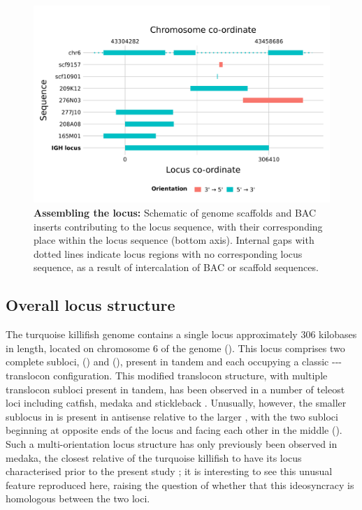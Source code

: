 \begin{figure}
\centering
\includegraphics[width=\textwidth]{_Figures/png/nfu-locus-aln}
\caption[Assembling the \Nfu \igh{} locus]{\textbf{Assembling the \Nfu \igh{} locus:} Schematic of genome scaffolds and BAC inserts contributing to the \Nfu \igh{} locus sequence, with their corresponding place within the locus sequence (bottom axis). Internal gaps with dotted lines indicate locus regions with no corresponding locus sequence, as a result of intercalation of BAC or scaffold sequences.}
\label{fig:nfu-locus-aln}
\end{figure}

\subsection{Overall locus structure}
\label{sec:nfu-locus-structure}
	
The turquoise killifish genome contains a single \igh{} locus approximately 306 kilobases in length, located on chromosome 6 of the \Nfu genome (). This locus comprises two complete subloci,  () and  (), present in tandem and each occupying a classic {\vh-\dh-\jh-\ch} translocon configuration. This modified translocon structure, with multiple translocon subloci present in tandem, has been observed in a number of teleost \igh{} loci including catfish, medaka and stickleback \parencite{fillatreau2013astonishing}. Unusually, however, the smaller  sublocus in \nfu \igh{} is present in antisense relative to the larger , with the two subloci beginning at opposite ends of the locus and facing each other in the middle (). Such a multi-orientation locus structure has only previously been observed in medaka, the closest relative of the turquoise killifish to have its locus characterised prior to the present study \parencite{magadan2011medaka}; it is interesting to see this unusual feature reproduced here, raising the question of whether that this ideosyncracy is homologous between the two loci.
	
